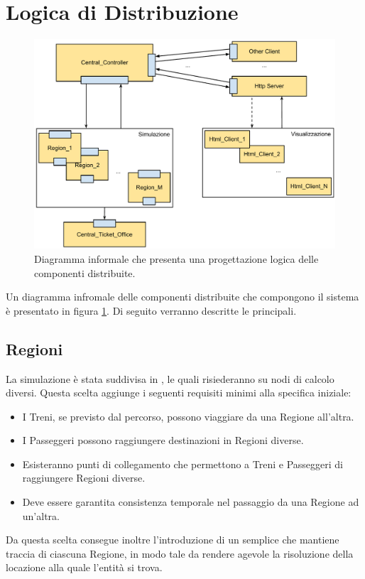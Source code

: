 \section{Logica di Distribuzione}

	\begin{figure}[htbp]
		\begin{center}
			\includegraphics[width=\textwidth,keepaspectratio]{imgs/logic_distribution.pdf}
			\caption{\footnotesize{Diagramma informale che presenta una progettazione logica delle componenti distribuite.}}
			\label{fig:logic_distribution}
		\end{center}
	\end{figure}

Un diagramma infromale delle componenti distribuite che compongono il sistema è presentato in figura \ref{fig:logic_distribution}. Di seguito verranno descritte le principali.
	
	\subsection{Regioni}\label{sec:distr_regioni}
	
	La simulazione è stata suddivisa in , le quali risiederanno su nodi di calcolo diversi. Questa scelta aggiunge i seguenti requisiti minimi alla specifica iniziale:
	\begin{itemize}
		\item I Treni, se previsto dal percorso, possono viaggiare da una Regione all'altra.
		\item I Passeggeri possono raggiungere destinazioni in Regioni diverse.
		\item Esisteranno punti di collegamento che permettono a Treni e Passeggeri di raggiungere Regioni diverse. 
		\item Deve essere garantita consistenza temporale nel passaggio da una Regione ad un'altra.
	\end{itemize}
	Da questa scelta consegue inoltre l'introduzione di un semplice  che mantiene traccia di ciascuna Regione, in modo tale da rendere agevole la risoluzione della locazione alla quale l'entità si trova. 
	
